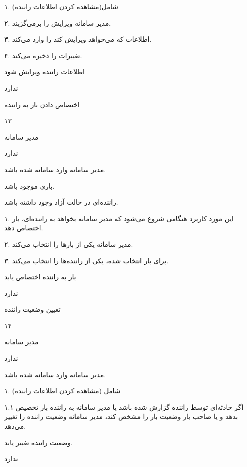 
۱. شامل(مشاهده کردن اطلاعات راننده)

۲. مدیر سامانه ویرایش را برمی‌گزیند.

۳. اطلاعات که می‌خواهد ویرایش کند را وارد می‌کند.

۴. تغییرات را ذخیره می‌کند.

اطلاعات راننده ویرایش شود

ندارد

\newpage

اختصاص دادن بار به راننده

۱۳

مدیر سامانه

ندارد


مدیر سامانه وارد سامانه شده باشد.

باری موجود باشد.

راننده‌ای در حالت آزاد وجود داشته باشد.


۱. این مورد کاربرد هنگامی شروع می‌شود که مدیر سامانه بخواهد به راننده‌ای، بار اختصاص دهد.

۲. مدیر سامانه یکی از بارها را انتخاب می‌کند.

۳. برای بار انتخاب شده، یکی از راننده‌ها را انتخاب می‌کند.

بار به راننده اختصاص یابد

ندارد

\newpage

تعیین وضعیت راننده

۱۴

مدیر سامانه

ندارد

مدیر سامانه وارد سامانه شده باشد.


۱. شامل (مشاهده کردن اطلاعات راننده)

۱.۱ اگر حادثه‌ای توسط راننده گزارش شده باشد یا مدیر سامانه به راننده بار تخصیص بدهد و یا صاحب بار وضعیت بار را مشخص کند، مدیر سامانه وضعیت راننده را تغییر می‌دهد.

وضعیت راننده تغییر یابد.

ندارد


\newpage

